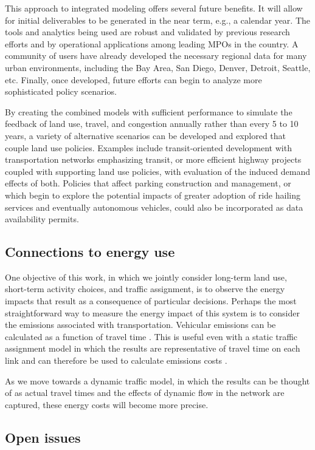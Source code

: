 This approach to integrated modeling offers several future benefits. It will allow for initial deliverables to be generated in the near term, e.g., a calendar year. The tools and analytics being used are robust and validated by previous research efforts and by operational applications among leading MPOs in the country. A community of users have already developed the necessary regional data for many urban environments, including the Bay Area, San Diego, Denver, Detroit, Seattle, etc. Finally, once developed, future efforts can begin to analyze more sophisticated policy scenarios.

By creating the combined models with sufficient performance to simulate the feedback of land use, travel, and congestion annually rather than every 5 to 10 years, a variety of alternative scenarios can be developed and explored that couple land use policies. Examples include transit-oriented development with transportation networks emphasizing transit, or more efficient highway projects coupled with supporting land use policies, with evaluation of the induced demand effects of both. Policies that affect parking construction and management, or which begin to explore the potential impacts of greater adoption of ride hailing services and eventually autonomous vehicles, could also be incorporated as data availability permits.

\subsection{Connections to energy use}

One objective of this work, in which we jointly consider long-term land use, short-term activity choices, and traffic assignment, is to observe the energy impacts that result as a consequence of particular decisions. Perhaps the most straightforward way to measure the energy impact of this system is to consider the emissions associated with transportation. Vehicular emissions can be calculated as a function of travel time \citep{ahn2008effects}. This is useful even with a static traffic assignment model in which the results are representative of travel time on each link and can therefore be used to calculate emissions costs \citep{aziz2012integration}.

As we move towards a dynamic traffic model, in which the results can be thought of as actual travel times and the effects of dynamic flow in the network are captured, these energy costs will become more precise.

\subsection{Open issues}

